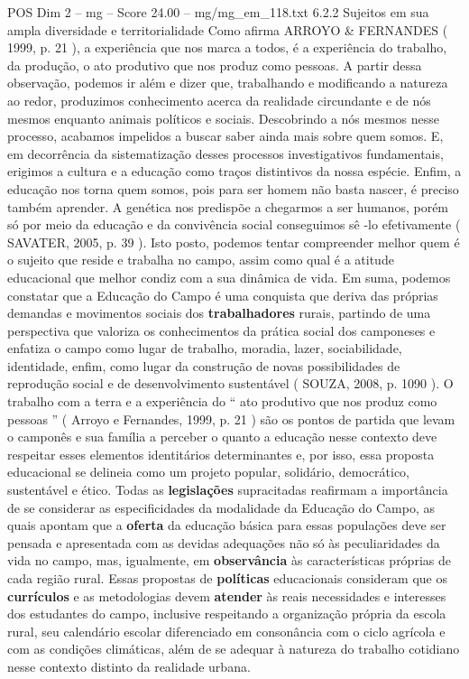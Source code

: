 \begin{textsample}{POS Dim 2 – mg – Score 24.00 – mg/mg\_em\_118.txt}  \label{ex:f2_pos_198}
6.2.2 Sujeitos em sua ampla diversidade e territorialidade Como afirma ARROYO \& FERNANDES ( 1999, p. 21 ), a experiência que nos marca a todos, é a experiência do trabalho, da produção, o ato produtivo que nos produz como pessoas.
A partir dessa observação, podemos ir além e dizer que, trabalhando e modificando a natureza ao redor, produzimos conhecimento acerca da realidade circundante e de nós mesmos enquanto animais políticos e sociais.
Descobrindo a nós mesmos nesse processo, acabamos impelidos a buscar saber ainda mais sobre quem somos.
E, em decorrência da sistematização desses processos investigativos fundamentais, erigimos a cultura e a educação como traços distintivos da nossa espécie.
Enfim, a educação nos torna quem somos, pois para ser homem não basta nascer, é preciso também aprender.
A genética nos predispõe a chegarmos a ser humanos, porém só por meio da educação e da convivência social conseguimos sê -lo efetivamente ( SAVATER, 2005, p. 39 ).
Isto posto, podemos tentar compreender melhor quem é o sujeito que reside e trabalha no campo, assim como qual é a atitude educacional que melhor condiz com a sua dinâmica de vida.
Em suma, podemos constatar que a Educação do Campo é uma conquista que deriva das próprias demandas e movimentos sociais dos \textbf{trabalhadores} rurais, partindo de uma perspectiva que valoriza os conhecimentos da prática social dos camponeses e enfatiza o campo como lugar de trabalho, moradia, lazer, sociabilidade, identidade, enfim, como lugar da construção de novas possibilidades de reprodução social e de desenvolvimento sustentável ( SOUZA, 2008, p. 1090 ).
O trabalho com a terra e a experiência do “ ato produtivo que nos produz como pessoas ” ( Arroyo e Fernandes, 1999, p. 21 ) são os pontos de partida que levam o camponês e sua família a perceber o quanto a educação nesse contexto deve respeitar esses elementos identitários determinantes e, por isso, essa proposta educacional se delineia como um projeto popular, solidário, democrático, sustentável e ético.
Todas as \textbf{legislações} supracitadas reafirmam a importância de se considerar as especificidades da modalidade da Educação do Campo, as quais apontam que a \textbf{oferta} da educação básica para essas populações deve ser pensada e apresentada com as devidas adequações não só às peculiaridades da vida no campo, mas, igualmente, em \textbf{observância} às características próprias de cada região rural.
Essas propostas de \textbf{políticas} educacionais consideram que os \textbf{currículos} e as metodologias devem \textbf{atender} às reais necessidades e interesses dos estudantes do campo, inclusive respeitando a organização própria da escola rural, seu calendário escolar diferenciado em consonância com o ciclo agrícola e com as condições climáticas, além de se adequar à natureza do trabalho cotidiano nesse contexto distinto da realidade urbana.

\end{textsample}
